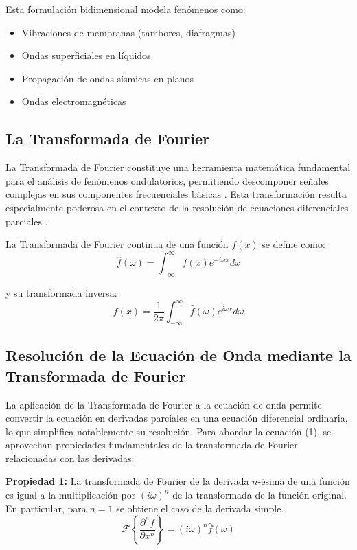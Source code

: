 \documentclass[a4paper]{article}
\begin{document}
Esta formulación bidimensional modela fenómenos como:

\begin{itemize}
    \item Vibraciones de membranas (tambores, diafragmas)
    \item Ondas superficiales en líquidos
    \item Propagación de ondas sísmicas en planos
    \item Ondas electromagnéticas
\end{itemize}

\subsection{La Transformada de Fourier}

La Transformada de Fourier constituye una herramienta matemática fundamental para el análisis de fenómenos ondulatorios, permitiendo
descomponer señales complejas en sus componentes frecuenciales básicas \cite{oppenheim1999discrete}. Esta transformación resulta especialmente poderosa en el
contexto de la resolución de ecuaciones diferenciales parciales \cite{strang2007computational}.

La Transformada de Fourier continua de una función $f(x)$ se define como:
\begin{equation}
    \hat{f}(\omega) = \int_{-\infty}^{\infty} f(x) e^{-i\omega x} dx
\end{equation}

y su transformada inversa:
\begin{equation}
    f(x) = \frac{1}{2\pi} \int_{-\infty}^{\infty} \hat{f}(\omega) e^{i\omega x} d\omega
\end{equation}

\subsection{Resolución de la Ecuación de Onda mediante la Transformada de Fourier}

La aplicación de la Transformada de Fourier a la ecuación de onda permite convertir la ecuación en derivadas parciales en una ecuación diferencial ordinaria,
lo que simplifica notablemente su resolución. Para abordar la ecuación (1), se aprovechan propiedades fundamentales de la transformada de Fourier relacionadas con las derivadas:

\textbf{Propiedad 1:} La transformada de Fourier de la derivada $n$-ésima de una función es igual a la multiplicación por $(i\omega)^n$ de la transformada de la función original. En particular, para $n=1$ se obtiene el caso de la derivada simple.
\begin{equation}
    \mathcal{F}\left\{\frac{\partial^n f}{\partial x^n}\right\} = (i\omega)^n \hat{f}(\omega)
\end{equation}
\end{document}
